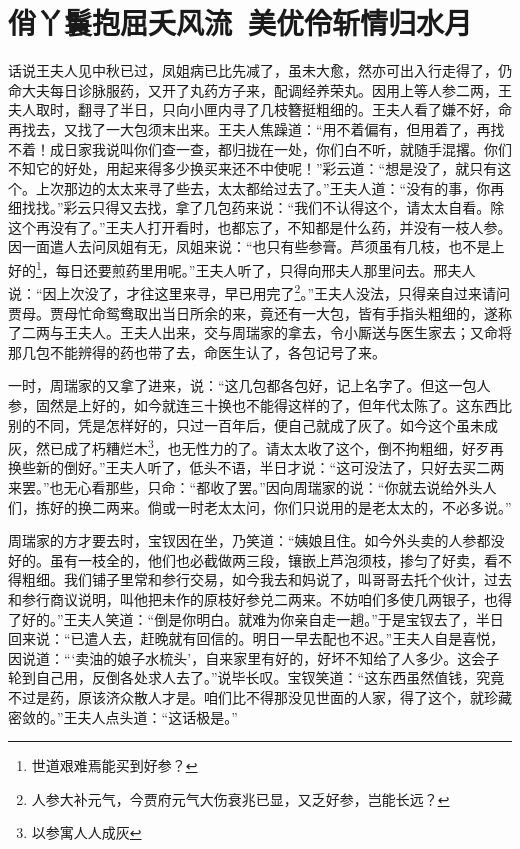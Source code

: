 \documentclass[12pt,oneside]{book}
\begin{document}
\chapter{俏丫鬟抱屈夭风流~美优伶斩情归水月}
话说王夫人见中秋已过，凤姐病已比先减了，虽未大愈，然亦可出入行走得了，仍命大夫每日诊脉服药，又开了丸药方子来，配调经养荣丸。因用上等人参二两，王夫人取时，翻寻了半日，只向小匣内寻了几枝簪挺粗细的。王夫人看了嫌不好，命再找去，又找了一大包须末出来。王夫人焦躁道：“用不着偏有，但用着了，再找不着！成日家我说叫你们查一查，都归拢在一处，你们白不听，就随手混撂。你们不知它的好处，用起来得多少换买来还不中使呢！”彩云道：“想是没了，就只有这个。上次那边的太太来寻了些去，太太都给过去了。”王夫人道：“没有的事，你再细找找。”彩云只得又去找，拿了几包药来说：“我们不认得这个，请太太自看。除这个再没有了。”王夫人打开看时，也都忘了，不知都是什么药，并没有一枝人参。因一面遣人去问凤姐有无，凤姐来说：“也只有些参膏。芦须虽有几枝，也不是上好的\footnote{世道艰难焉能买到好参？}，每日还要煎药里用呢。”王夫人听了，只得向邢夫人那里问去。邢夫人说：“因上次没了，才往这里来寻，早已用完了\footnote{人参大补元气，今贾府元气大伤衰兆已显，又乏好参，岂能长远？}。”王夫人没法，只得亲自过来请问贾母。贾母忙命鸳鸯取出当日所余的来，竟还有一大包，皆有手指头粗细的，遂称了二两与王夫人。王夫人出来，交与周瑞家的拿去，令小厮送与医生家去；又命将那几包不能辨得的药也带了去，命医生认了，各包记号了来。

一时，周瑞家的又拿了进来，说：“这几包都各包好，记上名字了。但这一包人参，固然是上好的，如今就连三十换也不能得这样的了，但年代太陈了。这东西比别的不同，凭是怎样好的，只过一百年后，便自己就成了灰了。如今这个虽未成灰，然已成了朽糟烂木\footnote{以参寓人人成灰}，也无性力的了。请太太收了这个，倒不拘粗细，好歹再换些新的倒好。”王夫人听了，低头不语，半日才说：“这可没法了，只好去买二两来罢。”也无心看那些，只命：“都收了罢。”因向周瑞家的说：“你就去说给外头人们，拣好的换二两来。倘或一时老太太问，你们只说用的是老太太的，不必多说。”

周瑞家的方才要去时，宝钗因在坐，乃笑道：“姨娘且住。如今外头卖的人参都没好的。虽有一枝全的，他们也必截做两三段，镶嵌上芦泡须枝，掺匀了好卖，看不得粗细。我们铺子里常和参行交易，如今我去和妈说了，叫哥哥去托个伙计，过去和参行商议说明，叫他把未作的原枝好参兑二两来。不妨咱们多使几两银子，也得了好的。”王夫人笑道：“倒是你明白。就难为你亲自走一趟。”于是宝钗去了，半日回来说：“已遣人去，赶晚就有回信的。明日一早去配也不迟。”王夫人自是喜悦，因说道：“‘卖油的娘子水梳头’，自来家里有好的，好坏不知给了人多少。这会子轮到自己用，反倒各处求人去了。”说毕长叹。宝钗笑道：“这东西虽然值钱，究竟不过是药，原该济众散人才是。咱们比不得那没见世面的人家，得了这个，就珍藏密敛的。”王夫人点头道：“这话极是。”
\end{document}
